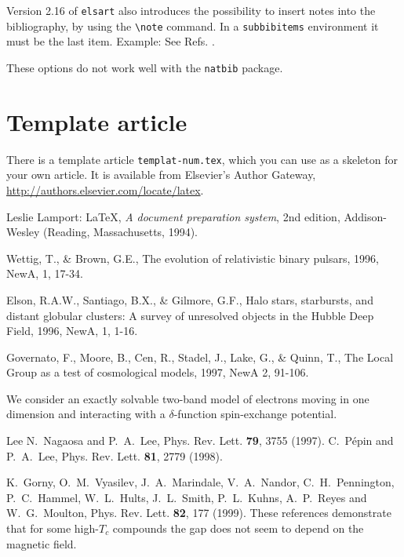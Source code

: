 \documentclass{elsart}
\def\file#1{\texttt{#1}}
\begin{document}
Version 2.16 of \texttt{elsart} also introduces the possibility to
insert notes into the bibliography, by using the \verb|\note| command.
In a \texttt{subbibitems} environment it must be the last item.
Example: See Refs. \cite{note,x}.

These options do not work well with the \texttt{natbib} package.

\section{Template article}
\label{templart}

There is a template article \file{templat-num.tex}, which you can use as a
skeleton for your own article. It is available from Elsevier's Author
Gateway, \url{http://authors.elsevier.com/locate/latex}.

\begin{thebibliography}{9}

Leslie Lamport: \LaTeX, {\em A document preparation system},
2nd edition, Addison-Wesley (Reading, Massachusetts, 1994).

Wettig, T., \& Brown, G.E.,
The evolution of relativistic binary pulsars,
1996, NewA, 1, 17-34.

Elson, R.A.W., Santiago, B.X., \& Gilmore, G.F.,
Halo stars, starbursts, and distant globular clusters:
A survey of unresolved objects in the Hubble Deep Field,
1996, NewA, 1, 1-16.

Governato, F., Moore, B., Cen, R., Stadel, J., Lake, G., \& Quinn, T.,
The Local Group as a test of cosmological models,
1997, NewA 2, 91-106.

%
  \note We consider an exactly solvable two-band model of electrons moving in
one dimension and interacting with a $\delta$-function spin-exchange
potential.

\begin{subbibitems}{Lee}
 N.~Nagaosa and P.~A.~Lee, Phys. Rev. Lett. {\bf 79}, 3755
(1997).
C.~P\'epin and P.~A.~Lee, Phys. Rev. Lett. {\bf 81},
  2779 (1998).
\end{subbibitems}

 K.~Gorny, O.~M.~Vyasilev,
J.~A.~Marindale, V.~A.~Nandor, C.~H.~Pennington, P.~C.~Hammel,
W.~L.~Hults, J.~L.~Smith, P.~L.~Kuhns, A.~P.~Reyes and W.~G.~Moulton,
Phys. Rev. Lett.  {\bf 82}, 177 (1999).
\note These references demonstrate that for some high-$T_c$ compounds
the gap does not seem to depend on the magnetic field.

\end{thebibliography}
\end{document}

